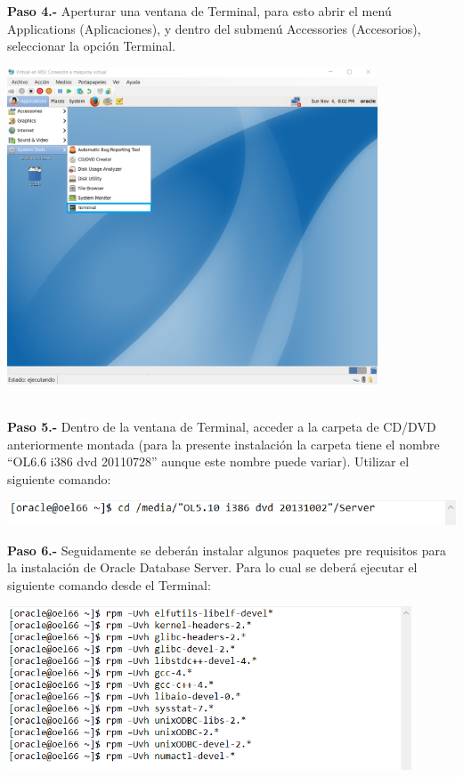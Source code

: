 \begin{enumerate}
\textbf {Paso 4.-} Aperturar una ventana de Terminal, para esto abrir el menú Applications (Aplicaciones), y dentro del submenú Accessories (Accesorios), seleccionar la opción Terminal.
\begin{center}
  \includegraphics[width=11cm]{Imagenes/Oracle_Database/4_Abrir_Terminal.png}
\end{center}
\vspace{12pt}\\

\textbf {Paso 5.-} Dentro de la ventana de Terminal, acceder a la carpeta de CD/DVD anteriormente montada (para la presente instalación la carpeta tiene el nombre “OL6.6 i386 dvd 20110728” aunque este nombre puede variar). Utilizar el siguiente comando:

\begin{center}
  \includegraphics[width=15cm]{Imagenes/Oracle_Database/Paso_5.png}
\end{center}
\break

\textbf {Paso 6.-} Seguidamente se deberán instalar algunos paquetes pre requisitos para la instalación de Oracle Database Server. Para lo cual se deberá ejecutar el siguiente comando desde el Terminal:

\begin{center}
  \includegraphics[width=12cm]{Imagenes/Oracle_Database/Paso_6.png}
\end{center}
\vspace{12pt}\\


\end{enumerate}
